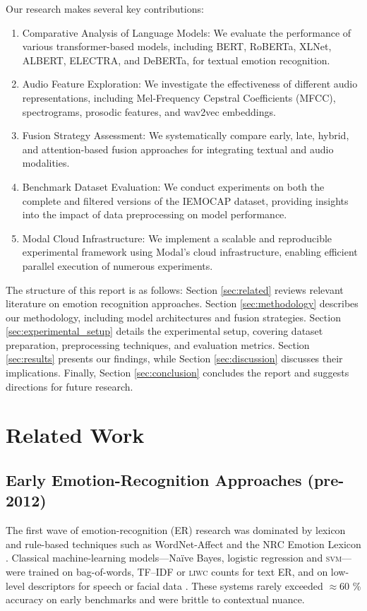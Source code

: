 \documentclass[12pt]{article}
\begin{document}
Our research makes several key contributions:

\begin{enumerate}
    \item Comparative Analysis of Language Models: We evaluate the performance of various transformer-based models, including BERT, RoBERTa, XLNet, ALBERT, ELECTRA, and DeBERTa, for textual emotion recognition.
    
    \item Audio Feature Exploration: We investigate the effectiveness of different audio representations, including Mel-Frequency Cepstral Coefficients (MFCC), spectrograms, prosodic features, and wav2vec embeddings.
    
    \item Fusion Strategy Assessment: We systematically compare early, late, hybrid, and attention-based fusion approaches for integrating textual and audio modalities.
    
    \item Benchmark Dataset Evaluation: We conduct experiments on both the complete and filtered versions of the IEMOCAP dataset, providing insights into the impact of data preprocessing on model performance.
    
    \item Modal Cloud Infrastructure: We implement a scalable and reproducible experimental framework using Modal's cloud infrastructure, enabling efficient parallel execution of numerous experiments.
\end{enumerate}

The structure of this report is as follows: Section \ref{sec:related} reviews relevant literature on emotion recognition approaches. Section \ref{sec:methodology} describes our methodology, including model architectures and fusion strategies. Section \ref{sec:experimental_setup} details the experimental setup, covering dataset preparation, preprocessing techniques, and evaluation metrics. Section \ref{sec:results} presents our findings, while Section \ref{sec:discussion} discusses their implications. Finally, Section \ref{sec:conclusion} concludes the report and suggests directions for future research.

\section{Related Work}
\label{sec:related_work}

\subsection{Early Emotion-Recognition Approaches (pre-2012)}
The first wave of emotion-recognition (ER) research was dominated by
lexicon and rule-based techniques such as WordNet-Affect
\cite{strapparava2004wordnet} and the NRC Emotion Lexicon
\cite{mohammad2013nrc}.  Classical machine-learning models—Naïve Bayes,
logistic regression and \textsc{svm}—were trained on bag-of-words, TF–IDF
or \textsc{liwc} counts for text ER, and on low-level descriptors for
speech or facial data \cite{schuller2009acoustic}.  These systems rarely
exceeded $\approx$60 \% accuracy on early benchmarks and were brittle to
contextual nuance.
\end{document}
